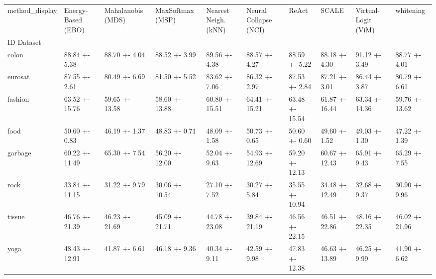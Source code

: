 \begin{tabular}{llllllllll}
\toprule
method_display & Energy-Based (EBO) & Mahalanobis (MDS) & MaxSoftmax (MSP) & Nearest Neigh. (kNN) & Neural Collapse (NCI) & ReAct & SCALE & Virtual-Logit (ViM) & whitening \\
ID Dataset &  &  &  &  &  &  &  &  &  \\
\midrule
colon & 88.84 +- 5.38 & 88.70 +- 4.04 & 88.52 +- 3.99 & 89.56 +- 4.38 & 88.57 +- 4.27 & 88.59 +- 5.22 & 88.18 +- 4.30 & 91.12 +- 3.49 & 88.77 +- 4.01 \\
eurosat & 87.55 +- 2.61 & 80.49 +- 6.69 & 81.50 +- 5.52 & 83.62 +- 7.06 & 86.32 +- 2.97 & 87.53 +- 2.84 & 87.21 +- 3.01 & 86.44 +- 3.87 & 80.79 +- 6.61 \\
fashion & 63.52 +- 15.76 & 59.65 +- 13.58 & 58.60 +- 13.88 & 60.80 +- 15.51 & 64.41 +- 15.21 & 63.48 +- 15.54 & 61.87 +- 16.44 & 63.34 +- 14.36 & 59.76 +- 13.62 \\
food & 50.60 +- 0.83 & 46.19 +- 1.37 & 48.83 +- 0.71 & 48.09 +- 1.58 & 50.73 +- 0.65 & 50.60 +- 0.60 & 49.60 +- 1.52 & 49.03 +- 1.30 & 47.22 +- 1.39 \\
garbage & 60.22 +- 11.49 & 65.30 +- 7.54 & 56.20 +- 12.00 & 52.04 +- 9.63 & 54.93 +- 12.69 & 59.20 +- 12.13 & 60.67 +- 12.43 & 65.91 +- 9.43 & 65.29 +- 7.55 \\
rock & 33.84 +- 11.15 & 31.22 +- 9.79 & 30.06 +- 10.54 & 27.10 +- 7.52 & 30.27 +- 5.84 & 35.55 +- 10.94 & 34.48 +- 12.49 & 32.68 +- 9.37 & 30.90 +- 9.96 \\
tissue & 46.76 +- 21.39 & 46.23 +- 21.69 & 45.09 +- 21.71 & 44.78 +- 23.08 & 39.84 +- 21.19 & 46.56 +- 22.15 & 46.51 +- 22.86 & 48.16 +- 22.35 & 46.02 +- 21.96 \\
yoga & 48.43 +- 12.91 & 41.87 +- 6.61 & 46.18 +- 9.36 & 40.34 +- 9.11 & 42.59 +- 9.98 & 47.83 +- 12.38 & 46.63 +- 13.89 & 46.25 +- 9.99 & 41.90 +- 6.62 \\
\bottomrule
\end{tabular}
